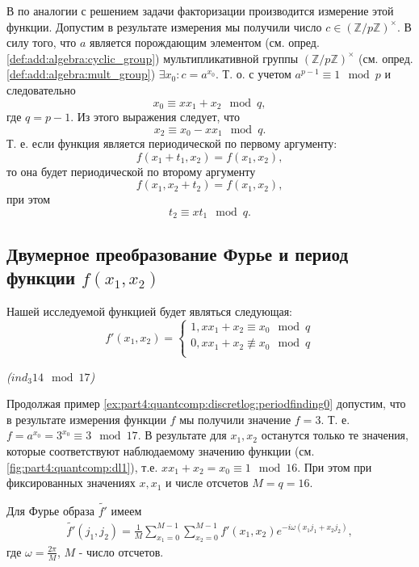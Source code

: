 В по аналогии с решением задачи факторизации производится измерение
этой функции. Допустим в результате измерения мы получили число $c \in
\left(\mathbb{Z}/p\mathbb{Z}\right)^\times$. В силу того, что $a$
является порождающим элементом (см. опред.
\ref{def:add:algebra:cyclic_group}) мультипликативной группы   
$\left(\mathbb{Z}/p\mathbb{Z}\right)^\times$ (см. опред.
\ref{def:add:algebra:mult_group}) $\exists x_0: c = a^{x_0}$. Т. о. с
учетом  $a^{p-1}
\equiv 1 \mod p$ и следовательно
\[
x_0 \equiv x x_1 + x_2 \mod q,
\] 
где $q = p - 1$.
Из этого выражения следует, что
\[
x_2 \equiv x_0 - x x_1 \mod q.
\]
Т. е. если функция является периодической по первому аргументу:
\[
f(x_1 + t_1, x_2) = f(x_1,x_2),
\]
то она будет периодической по второму аргументу
\[
f(x_1, x_2 + t_2) = f(x_1,x_2),
\]
при этом 
\begin{equation}
t_2 \equiv x t_1 \mod q.
\label{eq:part4:quantcomp:discretlogeq}
\end{equation}

\subsection{Двумерное преобразование Фурье и период функции $f(x_1,
  x_2)$}
Нашей исследуемой функцией будет являться следующая:
\[
f'\left(x_1, x_2\right) = 
\begin{cases}
1, x x_1 + x_2 \equiv x_0 \mod q \\
0, x x_1 + x_2 \not\equiv x_0 \mod q \\
\end{cases}
\]
\begin{example}
\emph{($ind_3{14} \mod{17}$)}
%


Продолжая пример \ref{ex:part4:quantcomp:discretlog:periodfinding0}
допустим, что в результате измерения функции $f$ мы получили значение
$f = 3$. Т. е. $f = a^{x_0} = 3^{x_0} \equiv 3 \mod 17$.  
В результате для $x_1, x_2$ останутся только те значения, 
которые соответствуют наблюдаемому значению функции (см.
\autoref{fig:part4:quantcomp:dl1}), т.е. $x x_1 + x_2 = x_0 \equiv 1
\mod 16$. При этом при фиксированных значениях $x, x_1$ и числе
отсчетов $M = q = 16$. 
\label{ex:part4:quantcomp:discretlog:periodfinding1}
\end{example}


Для Фурье образа $\tilde{f'}$ имеем 
\begin{eqnarray}
\tilde{f'}\left(j_1, j_2\right) = 
\frac{1}{M}\sum_{x_1 = 0}^{M-1}\sum_{x_2 = 0}^{M-1} 
f'\left(x_1, x_2\right)e^{-i \omega\left(x_1 j_1 + x_2j_2\right)},
\label{eq:part4:quantcomp:discretlog:ftq16_pre}
\end{eqnarray}
где $\omega = \frac{2 \pi}{M}$, $M$ - число отсчетов. 

